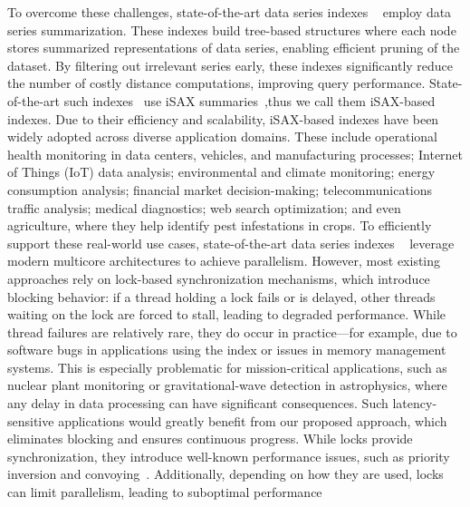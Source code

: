 \documentclass[a4paper,11pt,twoside,openany]{book}
\begin{document}
To overcome these challenges, state-of-the-art data series indexes
~\cite{DBLP:journals/pvldb/EchihabiZPB18,isax2plus,wang2013data,peng2018paris,parisplus,peng2020messi,PFP21-I,PFP21-II,hercules,dumpy}
employ data series summarization. These indexes build tree-based structures where each node 
stores summarized representations of data series, enabling efficient pruning of the dataset.
By filtering out irrelevant series early, these indexes significantly reduce the number of costly 
distance computations, improving query performance.
State-of-the-art such indexes~\cite{peng2020messi,parisplus,peng2021sing} 
use iSAX summaries~\cite{isax2plus,isaxfamily},thus we call them iSAX-based indexes.  
%
Due to their efficiency and scalability, iSAX-based indexes have been widely adopted across 
diverse application domains. These include operational health monitoring in data centers, 
vehicles, and manufacturing processes; Internet of Things (IoT) data analysis; environmental 
and climate monitoring; energy consumption analysis; financial market decision-making; 
telecommunications traffic analysis; medical diagnostics; web search optimization; 
and even agriculture, where they help identify pest infestations in crops.
%
To efficiently support these real-world use cases, state-of-the-art data series indexes
~\cite{DBLP:journals/pvldb/EchihabiZPB18,isaxfamily,peng2018paris,peng2020messi,PFP21-I,PFP21-II,hercules} 
leverage modern multicore architectures to achieve parallelism. However, most existing 
approaches rely on lock-based synchronization mechanisms, which introduce blocking behavior:
if a thread holding a lock fails or is delayed, other threads waiting on the lock are forced to stall,
leading to degraded performance.
While thread failures are relatively rare, they do occur in practice—for example, due to 
software bugs in applications using the index or issues in memory management systems. 
This is especially problematic for mission-critical applications, such as nuclear plant 
monitoring or gravitational-wave detection in astrophysics, where any delay in data processing 
can have significant consequences. Such latency-sensitive applications would greatly benefit
from our proposed approach, which eliminates blocking and ensures continuous progress.
%
While locks provide synchronization, they introduce well-known performance issues, 
such as priority inversion and convoying~\cite{F04}. Additionally, depending on how they
are used, locks can limit parallelism, leading to suboptimal performance
\end{document}
